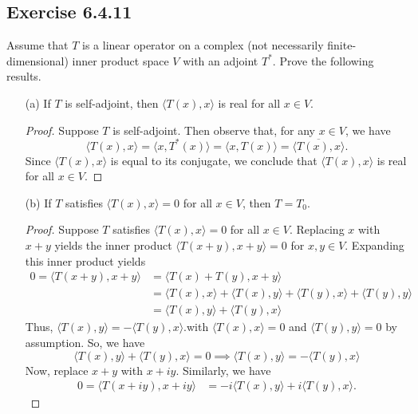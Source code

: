\subsection*{Exercise 6.4.11} Assume that \( T  \) is a linear operator on a complex (not necessarily finite-dimensional) inner product space \( V  \) with an adjoint \( T^{*} \). Prove the following results.
\begin{enumerate}
    \item[(a)] If \( T  \) is self-adjoint, then \( \langle T(x) , x \rangle \) is real for all \( x \in V  \).
        \begin{proof}
        Suppose \( T  \) is self-adjoint. Then observe that, for any \( x \in V  \), we have
        \[  \langle T(x) , x \rangle = \langle x  , T^{*}(x) \rangle = \langle x  , T(x) \rangle = \overline{\langle T(x) , x \rangle}. \]
        Since \( \langle T(x)  ,  x  \rangle  \) is equal to its conjugate, we conclude that \( \langle T(x)  , x  \rangle  \) is real for all \( x \in V  \).
        \end{proof}
    \item[(b)] If \( T  \) satisfies \( \langle T(x) , x \rangle = 0  \) for all \( x \in V  \), then \( T = {T}_{0} \).
        \begin{proof}
        Suppose \( T  \) satisfies \( \langle T(x)  , x  \rangle = 0  \) for all \( x \in V  \). Replacing \( x  \) with \( x + y \) yields the inner product \( \langle T(x+y) , x+y  \rangle = 0  \) for \( x,y \in V  \). Expanding this inner product yields
        \begin{align*}
            0 = \langle T(x+y) , x + y  \rangle &= \langle T(x) + T(y) ,  x + y  \rangle \\  
                                                &= \langle T(x)  , x  \rangle + \langle T(x)  , y  \rangle + \langle T(y ) , x  \rangle + \langle T(y) , y \rangle  \\
                                                &= \langle T(x) , y \rangle + \langle T(y) , x \rangle
        \end{align*}
         Thus, \( \langle T(x) , y \rangle = - \langle T(y) , x  \rangle \).with \( \langle T(x)  , x  \rangle = 0  \) and \( \langle T(y) , y  \rangle = 0  \) by assumption. So, we have
         \[  \langle T(x) , y \rangle + \langle T(y) , x \rangle = 0 \implies \langle T(x) , y \rangle = - \langle T(y) , x \rangle \tag{1} \]
Now, replace \( x + y  \) with \( x + iy  \). Similarly, we have
        \begin{align*}
            0 = \langle T(x+iy) , x + iy  \rangle &= - i \langle T(x) , y \rangle + i \langle T(y) , x \rangle.   

\end{align*}
\end{proof}
\end{enumerate}

